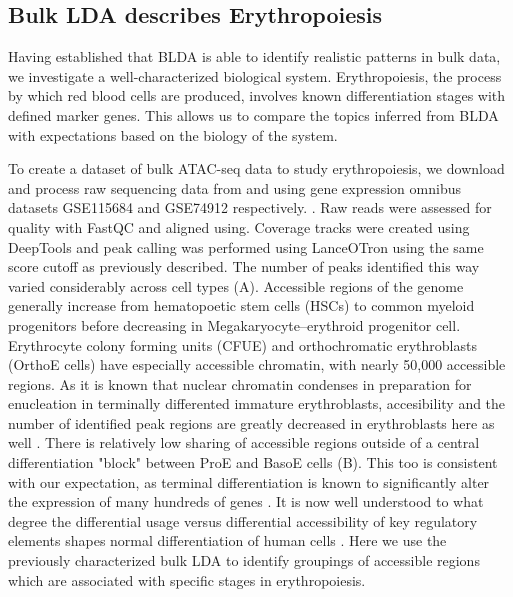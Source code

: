 \subsection{Bulk LDA describes Erythropoiesis}

Having established that BLDA is able to identify realistic patterns in bulk data, we investigate a well-characterized biological system. Erythropoiesis, the process by which red blood cells are produced, involves known differentiation stages with defined marker genes. This allows us to compare the topics inferred from BLDA with expectations based on the biology of the system.


To create a dataset of bulk ATAC-seq data to study erythropoiesis, we download and process raw sequencing data from \textcite{Ludwig2019} and \textcite{Corces2016} using gene expression omnibus datasets GSE115684 and GSE74912 respectively. . Raw reads were assessed for quality with FastQC and aligned using. Coverage tracks were created using DeepTools and peak calling was performed using LanceOTron using the same score cutoff as previously described. The number of peaks identified this way varied considerably across cell types (A). Accessible regions of the genome generally increase from hematopoetic stem cells (HSCs) to common myeloid progenitors before decreasing in Megakaryocyte–erythroid progenitor cell. Erythrocyte colony forming units (CFUE) and orthochromatic erythroblasts (OrthoE cells) have especially accessible chromatin, with nearly 50,000 accessible regions. As it is known that nuclear chromatin condenses in preparation for enucleation in terminally differented immature erythroblasts, accesibility and the number of identified peak regions are greatly decreased in erythroblasts here as well \cite{Schulz2019}. There is relatively low sharing of accessible regions outside of a central differentiation "block" between ProE and BasoE cells (B). This too is consistent with our expectation, as terminal differentiation is known to significantly alter the expression of many hundreds of genes \cite{Schulz2019}. It is now well understood to what degree the differential usage versus differential accessibility of key regulatory elements shapes normal differentiation of human cells \cite{Song2011,West2014}. Here we use the previously characterized bulk LDA to identify groupings of accessible regions which are associated with specific stages in erythropoiesis. 


